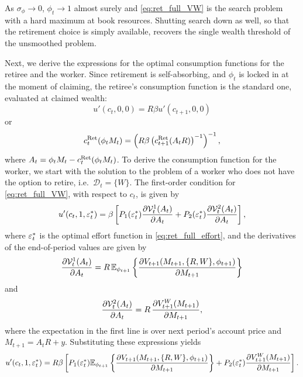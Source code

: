 As $\sigma_\phi \to 0$, $\phi_t \to 1$ almost surely and
\eqref{eq:ret_full_VW} is the search problem with a hard maximum at book resources.
Shutting search down as well, so that the retirement choice is simply available, recovers
the single wealth threshold of the unsmoothed problem.

Next, we derive the expressions for the optimal consumption functions for the retiree
and the worker. Since retirement is self-absorbing, and $\phi_t$ is locked in at the moment
of claiming, the retiree's consumption function is the standard one, evaluated at claimed
wealth:
\begin{equation}
u'(c_t, 0, 0) = R \beta u'(c_{t+1}, 0, 0)
\end{equation}
or
\begin{equation}
c_t^{\mathrm{Ret}}(\phi_t M_t) = \left( R \beta \left( c_{t+1}^{\mathrm{Ret}}(A_t R) \right)^{-1} \right)^{-1},
\end{equation}
where $A_t = \phi_t M_t - c_t^{\mathrm{Ret}}(\phi_t M_t)$. To derive the consumption function for the
worker, we start with the solution to the problem of a worker who does not have the
option to retire, i.e.\ $\mathcal{D}_t = \{W\}$. The first-order condition for
\eqref{eq:ret_full_VW}, with respect to $c_t$, is given by
\begin{equation}
u'(c_t, 1, \varepsilon_t^*) = \beta \left[
P_1(\varepsilon_t^*) \frac{\partial \mathcal{V}_t^1(A_t)}{\partial A_t}
+ P_2(\varepsilon_t^*) \frac{\partial \mathcal{V}_t^2(A_t)}{\partial A_t}
\right],
\end{equation}
where $\varepsilon_t^*$ is the optimal effort function in \eqref{eq:ret_full_effort}, and the derivatives
of the end-of-period values are given by
\begin{equation}
\frac{\partial \mathcal{V}_t^1(A_t)}{\partial A_t}
= R\, \mathbb{E}_{\phi_{t+1}} \left\{ \frac{\partial V_{t+1}(M_{t+1}, \{R, W\}, \phi_{t+1})}{\partial M_{t+1}} \right\}
\end{equation}
and
\begin{equation}
\frac{\partial \mathcal{V}_t^2(A_t)}{\partial A_t}
= R\, \frac{\partial V_{t+1}^{W}(M_{t+1})}{\partial M_{t+1}},
\end{equation}
where the expectation in the first line is over next period's account price and
$M_{t+1} = A_t R + y$.
Substituting these expressions yields
\begin{equation}
u'(c_t, 1, \varepsilon_t^*) = R \beta \left[
P_1(\varepsilon_t^*) \mathbb{E}_{\phi_{t+1}} \left\{ \frac{\partial V_{t+1}(M_{t+1}, \{R, W\}, \phi_{t+1})}{\partial M_{t+1}} \right\}
+ P_2(\varepsilon_t^*) \frac{\partial V_{t+1}^{W}(M_{t+1})}{\partial M_{t+1}}
\right].
\end{equation}
